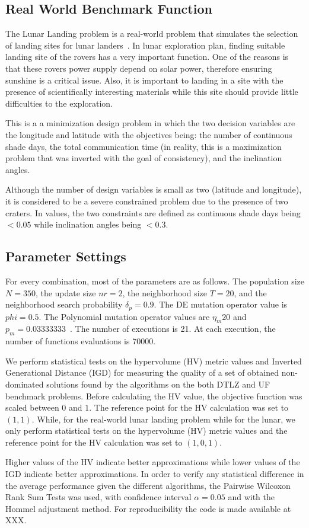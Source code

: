\subsection{Real World Benchmark Function}


The Lunar Landing problem is a real-world problem that simulates the selection of landing sites for lunar landers~\citep{MoonOrbitingSatellite2015}. In lunar exploration plan, finding suitable landing site of the rovers has a very important function. One of the reasons is that these rovers power supply depend on solar power, therefore ensuring sunshine is a critical issue. Also, it is important to landing in a site with the presence of scientifically interesting materials while this site should provide little difficulties to the exploration. 

This is a a minimization design problem in which the two decision variables are the longitude and latitude with the objectives being: the number of continuous shade days, the total communication time (in reality, this is a maximization problem that was inverted with the goal of consistency), and the inclination angles. 

Although the number of design variables is small as two (latitude and longitude), it is considered to be a severe constrained problem due to the presence of two craters. In values, the two constraints are defined as continuous shade days  being $ < 0.05$ while inclination angles being $<0.3$.

\subsection{Parameter Settings}

For every combination, most of the parameters are as follows. The population size $N = 350$, the update size $nr = 2$, the neighborhood size $T = 20$, and the neighborhood search probability $\delta_p = 0.9$. The DE mutation operator value is $phi=0.5$. The Polynomial mutation operator values are $\eta_m 20$ and $p_m = 0.03333333$~\cite{campelo2018moeadr}. The number of executions is 21. At each execution, the number of functions evaluations is 70000.

We perform statistical tests on the hypervolume (HV) metric values and Inverted Generational Distance (IGD) for measuring the quality of a set of obtained non-dominated solutions found by the algorithms on the both DTLZ and UF benchmark problems. Before calculating the HV value, the objective function was scaled between $0$ and $1$. The reference point for the HV calculation was set to $(1, 1)$. While, for the real-world lunar landing problem while for the lunar,  we only perform statistical tests on the hypervolume (HV) metric values and the reference point for the HV calculation was set to $(1, 0, 1)$. 

Higher values of the HV indicate better approximations while lower values of the IGD indicate better approximations. In order to verify any statistical difference in the average performance given the different algorithms, the Pairwise Wilcoxon Rank Sum Tests was used, with confidence interval $\alpha = 0.05$ and with the Hommel adjustment method. For reproducibility the code is made available at XXX.
